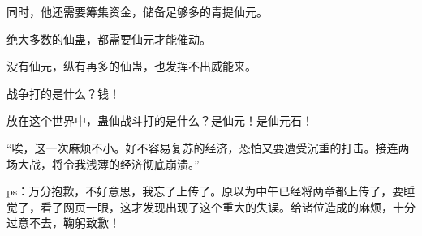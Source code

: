 \begin{this_body}
同时，他还需要筹集资金，储备足够多的青提仙元。

绝大多数的仙蛊，都需要仙元才能催动。

没有仙元，纵有再多的仙蛊，也发挥不出威能来。

战争打的是什么？钱！

放在这个世界中，蛊仙战斗打的是什么？是仙元！是仙元石！

“唉，这一次麻烦不小。好不容易复苏的经济，恐怕又要遭受沉重的打击。接连两场大战，将令我浅薄的经济彻底崩溃。”

ps：万分抱歉，不好意思，我忘了上传了。原以为中午已经将两章都上传了，要睡觉了，看了网页一眼，这才发现出现了这个重大的失误。给诸位造成的麻烦，十分过意不去，鞠躬致歉！

\end{this_body}

